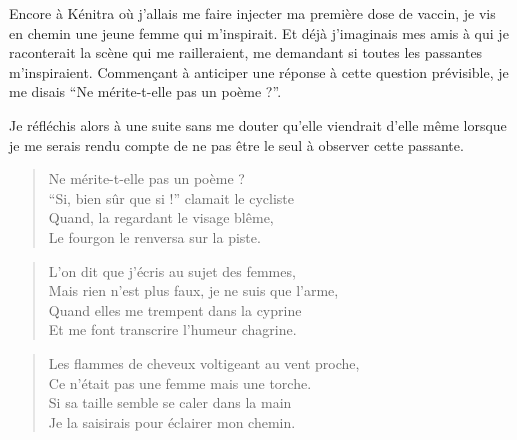 \begin{prose}
  Encore à Kénitra où j’allais me faire injecter ma première dose de vaccin, je vis en  chemin une jeune femme qui m’inspirait. Et déjà j’imaginais mes amis à qui je raconterait la scène qui me railleraient, me demandant si toutes les passantes m’inspiraient. Commençant à anticiper une réponse à cette question prévisible, je me disais \enquote{Ne mérite-t-elle pas un poème ?}.

  Je réfléchis alors à une  suite sans me douter qu’elle viendrait d’elle même lorsque je me serais rendu compte de ne pas être le seul à observer cette passante.
\end{prose}

\begin{verse}%
  \quatrain%
  Ne mérite-t-elle pas un poème ?\\  %
  \enquote{Si, bien sûr que si !} clamait le cycliste\\  %
  Quand, la regardant le visage blême,\\  %
  Le fourgon le renversa sur la piste.
\end{verse}


\begin{verse}%
  \quatrain%
  L’on dit que j’écris au sujet des femmes,\\  %
  Mais rien n’est plus faux, je ne suis que l’arme,\\  %
  Quand elles me trempent dans la cyprine\\  %
  Et me font transcrire l’humeur chagrine.
\end{verse}

\begin{verse}%
  \quatrain%
  Les flammes de cheveux voltigeant au vent proche,\\  %
  Ce n’était pas une femme mais une torche.\\  %
  Si sa taille semble se caler dans la main\\  %
  Je la saisirais pour éclairer mon chemin.
\end{verse}

